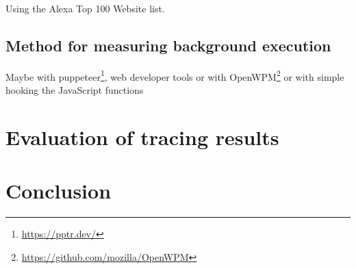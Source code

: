 \documentclass[article,type=bsc,colorback,accentcolor=tud9c]{tudthesis}
\begin{document}
  Using the Alexa Top 100 Website list.
  
  \subsection{Method for measuring background execution}

  Maybe with puppeteer\footnote{\url{https://pptr.dev/}}, web developer tools or with OpenWPM\footnote{\url{https://github.com/mozilla/OpenWPM}} or with simple hooking the JavaScript functions



  
  \newpage
  \section{Evaluation of tracing results}

  
  \newpage
  \section{Conclusion}

  

  

   
\end{document}
